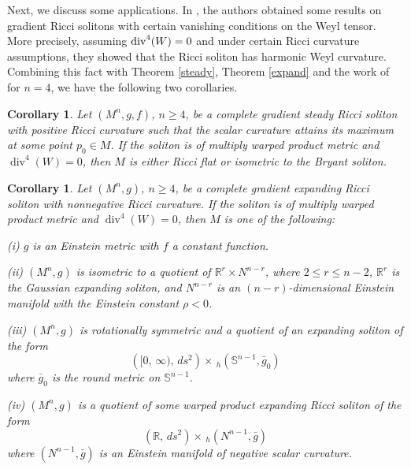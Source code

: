 \documentclass{amsart}
\newtheorem{corollary}[theorem]{Corollary}
\theoremstyle{definition}
\theoremstyle{remark}
\numberwithin{equation}{section}
\begin{document}
Next, we discuss some applications. 
In \cite{CMM}, the authors obtained some results on gradient Ricci solitons with certain vanishing conditions on the Weyl tensor. More precisely, assuming ${\rm div}^4(W)=0$ and under certain Ricci curvature assumptions,
they showed that the Ricci soliton has harmonic Weyl curvature. 
Combining this fact with Theorem \ref{steady}, Theorem \ref{expand} and the work of \cite{Kim} for $n=4$, we have the following two corollaries. 

\begin{corollary}\label{cor1.4}
	Let $(M^n,g,f)$, $n\geq 4$, be a complete gradient steady Ricci soliton
	with positive Ricci curvature such that the scalar curvature attains its maximum at some point $p_0\in M$. 
	If the soliton is of multiply warped product metric and $\operatorname{div}^4(W)=0$, then $M$ is either Ricci flat or isometric to the Bryant soliton.
\end{corollary}

\begin{corollary}\label{cor1.6}
	Let $(M^n,g)$, $n\geq 4$, be a complete gradient expanding Ricci soliton with nonnegative Ricci curvature. 
	If the soliton is of multiply warped product metric and $\operatorname{div}^4(W)=0$, then $M$ is one of the following: 
	
	\smallskip
	{\rm (i)} $g$ is an Einstein metric with $f$ a constant function.
	
	\smallskip	
	{\rm (ii)} $(M^n, g)$ is isometric to a quotient of 
	$ \mathbb{R}^{r} \times {N}^{n-r}$,
	where $2 \leq r\leq n-2$, $ \mathbb{R}^{r}$ is the Gaussian expanding soliton,
	and ${N}^{n-r}$ is an $(n-r)$-dimensional Einstein
	manifold with the Einstein constant $\rho < 0$.	
	
	\smallskip	
	{\rm (iii)} $(M^n, g)$ is rotationally symmetric and a quotient of an expanding soliton of the form
	\[
	\left( [0,\, \infty),\, ds^2 \right) \times \,_h\left(\mathbb{S}^{n-1}, \bar{g}_0 \right) 
	\]
	where $\bar{g}_0$ is the round metric on $\mathbb{S}^{n-1}$.
	
	\smallskip
	{\rm (iv)} $(M^n, g)$ is a quotient of some warped product expanding Ricci soliton of the form
	\[
	\left(\mathbb{R} ,\, ds^2 \right) \times \, _h\left(N^{n-1}, \bar{g} \right) 
	\]
	where $\left(N^{n-1}, \bar{g} \right) $ is an Einstein manifold of negative scalar curvature.
\end{corollary}
	
	
\end{document}
